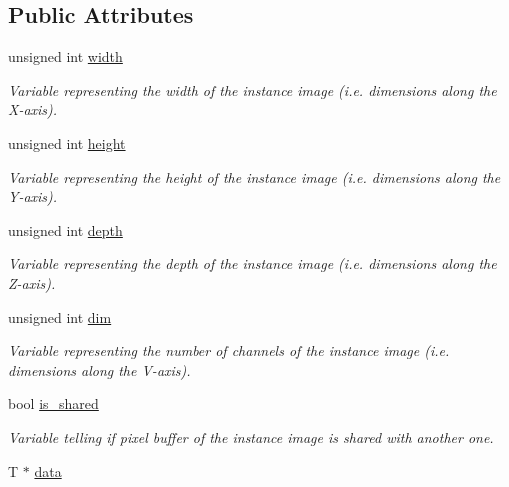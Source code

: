 \subsection*{Public Attributes}
\begin{DoxyCompactItemize}
\item 
unsigned int \hyperlink{structcimg__library_1_1_c_img_a5fb74a7776210bb99fd6755319ade13f}{width}
\begin{DoxyCompactList}\small\item\em Variable representing the width of the instance image (i.e. dimensions along the X-\/axis). \item\end{DoxyCompactList}\item 
unsigned int \hyperlink{structcimg__library_1_1_c_img_a30d575fd18ae525e507315de71b4806a}{height}
\begin{DoxyCompactList}\small\item\em Variable representing the height of the instance image (i.e. dimensions along the Y-\/axis). \item\end{DoxyCompactList}\item 
unsigned int \hyperlink{structcimg__library_1_1_c_img_a982d5d1e153477adf7f851106fe8ee3a}{depth}
\begin{DoxyCompactList}\small\item\em Variable representing the depth of the instance image (i.e. dimensions along the Z-\/axis). \item\end{DoxyCompactList}\item 
unsigned int \hyperlink{structcimg__library_1_1_c_img_ac9648dfe0a26d58e6e0030a3dbca234e}{dim}
\begin{DoxyCompactList}\small\item\em Variable representing the number of channels of the instance image (i.e. dimensions along the V-\/axis). \item\end{DoxyCompactList}\item 
\hypertarget{structcimg__library_1_1_c_img_a324b08e7f83d22a0166f2e4571d61543}{
bool \hyperlink{structcimg__library_1_1_c_img_a324b08e7f83d22a0166f2e4571d61543}{is\_\-shared}}
\label{structcimg__library_1_1_c_img_a324b08e7f83d22a0166f2e4571d61543}

\begin{DoxyCompactList}\small\item\em Variable telling if pixel buffer of the instance image is shared with another one. \item\end{DoxyCompactList}\item 
\hypertarget{structcimg__library_1_1_c_img_a54f252b86f19b2217aef3ec9e1e2e013}{
T $\ast$ \hyperlink{structcimg__library_1_1_c_img_a54f252b86f19b2217aef3ec9e1e2e013}{data}}
\label{structcimg__library_1_1_c_img_a54f252b86f19b2217aef3ec9e1e2e013}


\end{DoxyCompactItemize}
